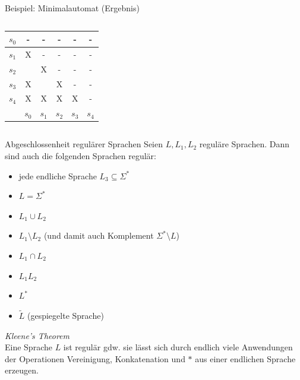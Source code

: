 \begin{frame}{Beispiel: Minimalautomat (Ergebnis)}
	\begin{columns}
		\centering
		\begin{tabular}{|r||c|c|c|c|c|}
			\hline
			$s_0$ & - & - & - & - & - \\
			\hline
			$s_1$ & X & - & - & - & - \\
			\hline
			$s_2$ &  & X & - & - & - \\
			\hline
			$s_3$ & X &  & X & - & - \\
			\hline
			$s_4$ & X & X & X & X & - \\
			\hline
			\hline
			& $s_0$ & $s_1$ & $s_2$ & $s_3$ & $s_4$ \\
			\hline
		\end{tabular}
		\centering
	\end{columns}
\end{frame}

\begin{frame}{Abgeschlossenheit regulärer Sprachen}
	Seien $L, L_1, L_2$ reguläre Sprachen. Dann sind auch die folgenden Sprachen regulär:
	\begin{itemize}
		\item jede endliche Sprache $L_{3} \subseteq \Sigma^*$
		\item $L = \Sigma^*$
		\item $L_1 \cup L_2$
		\item $L_1 \setminus L_2$ (und damit auch Komplement $\Sigma^* \setminus L$)
		\item $L_1 \cap L_2$
		\item $L_1L_2$
		\item $L^*$
		\item $\tilde{L}$ (gespiegelte Sprache)
	\end{itemize}
	\emph{Kleene's Theorem}\\
		Eine Sprache $L$ ist regulär gdw. sie lässt sich durch endlich viele
		Anwendungen der Operationen Vereinigung, Konkatenation und $*$ aus
		einer endlichen Sprache erzeugen.
\end{frame}

